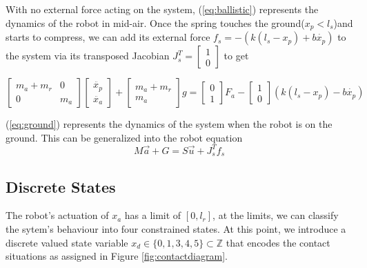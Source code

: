 \documentclass[12pt, a4paper]{report}
\begin{document}
With no external force acting on the system, (\ref{eq:ballistic}) represents the dynamics of the robot in mid-air. Once the spring touches the ground($x_{p}<l_{s}$)and starts to compress, we can add its external force $f_{s} = -(k(l_{s}-x_{p})+b\dot{x_{p}})$ to the system via its transposed Jacobian $J_{s}^{T} = \begin{bmatrix}
1\\0
\end{bmatrix}$ to get

\begin{equation}
\begin{bmatrix}
m_{a} + m_{r}&0\\
0 & m_{a}
\end{bmatrix}
\begin{bmatrix}
\ddot{x_{p}}\\
\ddot{x_{a}}
\end{bmatrix}
+\begin{bmatrix}
m_{a}+m_{r}\\m_{a}
\end{bmatrix}g =
\begin{bmatrix}
0\\1
\end{bmatrix}
F_{a} - 
\begin{bmatrix}
1\\0
\end{bmatrix}
(k(l_{s}-x_{p})-b\dot{x_{p}})
\label{eq:ground}
\end{equation}

(\ref{eq:ground}) represents the dynamics of the system when the robot is on the ground. This can be generalized into the robot equation
\begin{equation}
	M\vec{a} + G = S\vec{u} + J_{s}^{T}f_{s}
\end{equation}

\subsection*{Discrete States}

 The robot's actuation of $x_{a}$ has a limit of $[0, l_{r}]$, at the limits, we can classify the sytem's behaviour into four constrained states. At this point, we introduce a discrete valued state variable $x_{d} \in \{0, 1, 3, 4, 5\} \subset \mathbb{Z}$ that encodes the contact situations as assigned in Figure \ref{fig:contactdiagram}.\par
\end{document}
